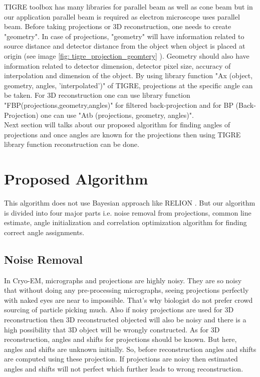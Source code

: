 \documentclass{report}
\begin{document}
TIGRE toolbox has many libraries for parallel beam as well as cone beam but in our application parallel beam is required as electron microscope uses parallel beam. Before taking projections or 3D reconstruction, one needs to create "geometry". In case of projections, "geometry" will have information related to source distance and detector distance from the object when object is placed at origin (see image \ref{fig: tigre_projection_geomtery} ). Geometry should also have information related to detector dimension, detector pixel size, accuracy of interpolation and dimension of the object. By using library function "Ax (object, geometry, angles, 'interpolated')" of TIGRE, projections at the specific angle can be taken. For 3D reconstruction one can use library function "FBP(projections,geometry,angles)" for filtered back-projection and for BP (Back-Projection) one can use "Atb (projections, geometry, angles)".\\

Next section will talks about our proposed algorithm for finding angles of projections and once angles are known for the projections then using TIGRE library function reconstruction can be done.

\section{Proposed Algorithm}\label{sec: Proposed_Algorithm}
This algorithm does not use Bayesian approach like RELION \cite{scheres2012relion}. But our algorithm is divided into four major parts i.e. noise removal from projections, common line estimate, angle initialization and  correlation optimization algorithm for finding correct angle assignments.

\subsection{Noise Removal} \label{subsec: noise-removal from projection}

In Cryo-EM, micrographs and projections are highly noisy. They are so noisy that without doing any pre-processing micrographs, seeing projections perfectly with naked eyes are near to impossible. That's why biologist do not prefer crowd sourcing of particle picking \cite{bruggemann2017exploring} much. Also if noisy projections are used for 3D reconstruction then 3D reconstructed objected will also be noisy and there is a high possibility that 3D object will be wrongly constructed. As for 3D reconstruction, angles and shifts for projections should be known. But here, angles and shifts are unknown initially. So, before reconstruction angles and  shifts are computed using these projection. If projections are noisy then estimated angles and shifts will not perfect which further leads to wrong reconstruction. 
\end{document}
